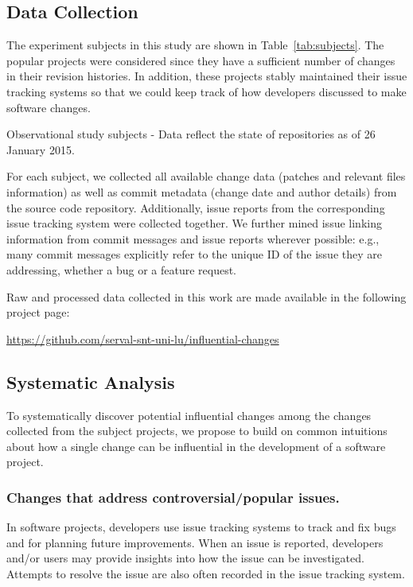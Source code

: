 
\subsection{Data Collection}
The experiment subjects in this study are shown in 
Table~\ref{tab:subjects}. The \numSubjects popular
projects were considered since they have a sufficient number of 
changes in their revision histories. In addition,
these projects stably maintained their issue tracking systems so that we
could keep track of how developers discussed to make software changes.

\begin{table}[h!]
    \caption{Observational study subjects - Data reflect the state of repositories as of 26 January 2015.}
    \label{tab:subjects}
    
\end{table}

For each subject, we collected all available change data (patches and relevant
files information) as well as commit metadata (change date and author details) from
the source code repository.
Additionally, issue reports from the corresponding issue tracking system were
collected together. We further mined issue linking information from commit
messages and issue reports wherever possible: e.g., many commit messages
explicitly refer to the unique ID of the issue they are addressing, whether a
bug or a feature request.

Raw and processed data collected in this work are made available in the following project page: 
\begin{center}
	\url{https://github.com/serval-snt-uni-lu/influential-changes}
\end{center}

\subsection{Systematic Analysis}
\label{sec:systemanalysis}
To systematically discover potential influential changes among the changes collected from
the subject projects, we propose to build on common intuitions about how a single change can
be influential in the development of a software project.

\subsubsection{Changes that address controversial/popular issues.}
\label{sec:blocking}
In software projects, developers use issue tracking systems
to track and fix bugs and for planning
future improvements. When an issue is reported, developers and/or
users may provide insights into how the issue can be investigated. 
Attempts to resolve the issue are also often recorded in the issue tracking
system.

